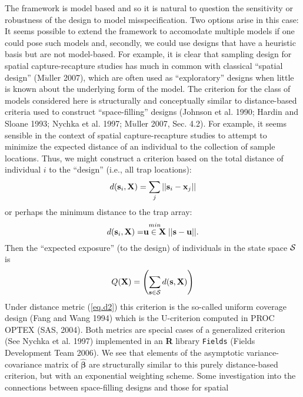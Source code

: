 \documentclass[useAMS,referee]{biom}
\begin{document}
The framework is model based and so it is natural to question the
sensitivity or robustness of the design to model misspecification.
Two options arise in this case: It seems possible to extend the
framework to accomodate multiple models if one could pose such models
and, secondly, we could use designs that have a heuristic basis but
are not model-based. For example, it is clear that 
sampling design for spatial capture-recapture studies has much in
common with classical ``spatial design'' (M$\ddot{u}$ller 2007),
which are often used as ``exploratory'' designs when little is
known about the underlying form of the model.
The criterion for the class of models considered here is structurally
and conceptually similar to distance-based criteria used to construct
``space-filling'' designs (Johnson et al. 1990; Hardin and Sloane
1993; Nychka et al. 1997; M$\ddot{u}$ller 2007, Sec. 4.2).  For example, it seems sensible in the
context of spatial capture-recapture studies to attempt to minimize
the expected distance of an individual to the collection of sample
locations.  Thus, we might construct a criterion based on the total
distance of individual $i$ to the ``design'' (i.e., all trap
locations):
\begin{equation}
d({\bf s}_{i}, {\bf X}) =  \sum_{j}   ||{\bf s}_{i} - {\bf x}_{j} ||
\label{eq.d1}
\end{equation}
or perhaps the minimum distance to the trap array:
\begin{equation}
 d({\bf s}_{i},{\bf X}) = \stackrel{min}{{\bf u} \in {\bf X}} ||{\bf
   s} -{\bf u}||.
\label{eq.d2}
\end{equation}
Then the ``expected exposure'' (to the design) of individuals
in the state space ${\cal S}$ is
\begin{equation}
 Q({\bf X}) = 
\left(
 \sum_{{\bf s} \in {\cal S}} d({\bf  s},{\bf X}) \right)
\label{eq.spacefilling}
\end{equation}
Under distance metric (\ref{eq.d2}) this criterion is the so-called
uniform coverage design
(Fang and Wang 1994)
which is the U-criterion 
computed in PROC
OPTEX (SAS, 2004). Both metrics are special cases of a generalized
criterion (See Nychka et al. 1997) implemented in an {\bf R} library
{\tt Fields} (Fields Development Team 2006).  We see that elements of
the asymptotic variance-covariance matrix of $\hat{\bm \beta}$ are
structurally similar to this purely distance-based criterion, but with
an exponential weighting scheme.  Some investigation into the
connections between space-filling designs and those for spatial
\end{document}
